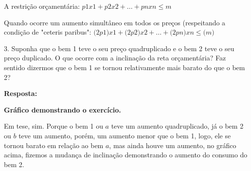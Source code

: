\documentclass[a4paper, 12pt]{article} %
\begin{document}
\begin{flushleft}
\begin{center}

A restrição orçamentária: $\textit{p1x1} + \textit{p2x2} +...+ \textit{pnxn} \leq \textit{m}$ \singlespacing

Quando ocorre um aumento simultâneo em todos os preços (respeitando a condição de "ceteris paribus":  $\textit{(2p1)x1} + \textit{(2p2)x2} +...+ \textit{(2pn)xn} \leq \textit{(m)}$ \singlespacing

\end{center}

 \singlespacing

3. Suponha que o bem 1 teve o seu preço quadruplicado e o bem 2 teve o seu preço duplicado. O que ocorre com a inclinação da reta orçamentária? Faz sentido dizermos que o bem 1 se tornou relativamente mais barato do que o bem 2? \singlespacing

\textbf{Resposta:} 
\\
\begin{center}
\textbf{Gráfico demonstrando o exercício.} 
\singlespacing
{}    
\singlespacing

\end{center}

Em tese, sim. Porque o bem 1 ou $\textit{a}$ teve um aumento quadruplicado, já o bem 2 ou $\textit{b}$ teve um aumento, porém, um aumento menor que o bem 1, logo, ele se tornou barato em relação ao bem $\textit{a}$, mas ainda houve um aumento, no gráfico acima, fizemos a mudança de inclinação demonstrando o aumento do consumo do bem 2. \singlespacing


\end{flushleft}
\end{document}
